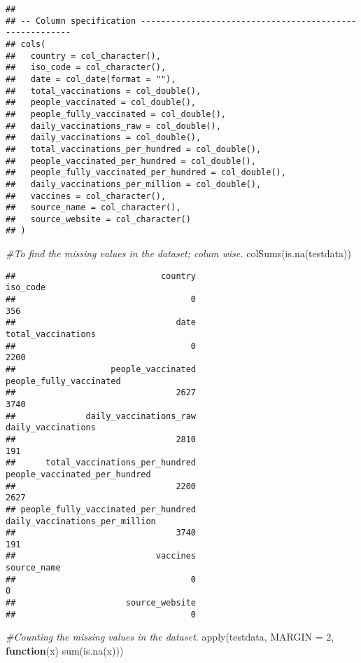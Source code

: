 \documentclass[
]{article}
\newenvironment{Shaded}{\begin{snugshade}}{\end{snugshade}}
\newcommand{\AttributeTok}[1]{\textcolor[rgb]{0.77,0.63,0.00}{#1}}
\newcommand{\CommentTok}[1]{\textcolor[rgb]{0.56,0.35,0.01}{\textit{#1}}}
\newcommand{\ControlFlowTok}[1]{\textcolor[rgb]{0.13,0.29,0.53}{\textbf{#1}}}
\newcommand{\DecValTok}[1]{\textcolor[rgb]{0.00,0.00,0.81}{#1}}
\newcommand{\FunctionTok}[1]{\textcolor[rgb]{0.00,0.00,0.00}{#1}}
\newcommand{\NormalTok}[1]{#1}
\begin{document}
\begin{verbatim}
## 
## -- Column specification --------------------------------------------------------
## cols(
##   country = col_character(),
##   iso_code = col_character(),
##   date = col_date(format = ""),
##   total_vaccinations = col_double(),
##   people_vaccinated = col_double(),
##   people_fully_vaccinated = col_double(),
##   daily_vaccinations_raw = col_double(),
##   daily_vaccinations = col_double(),
##   total_vaccinations_per_hundred = col_double(),
##   people_vaccinated_per_hundred = col_double(),
##   people_fully_vaccinated_per_hundred = col_double(),
##   daily_vaccinations_per_million = col_double(),
##   vaccines = col_character(),
##   source_name = col_character(),
##   source_website = col_character()
## )
\end{verbatim}

\begin{Shaded}
\begin{Highlighting}[]
\CommentTok{\#To find the missing values in the dataset; colum wise.}
\FunctionTok{colSums}\NormalTok{(}\FunctionTok{is.na}\NormalTok{(testdata))}
\end{Highlighting}
\end{Shaded}

\begin{verbatim}
##                             country                            iso_code 
##                                   0                                 356 
##                                date                  total_vaccinations 
##                                   0                                2200 
##                   people_vaccinated             people_fully_vaccinated 
##                                2627                                3740 
##              daily_vaccinations_raw                  daily_vaccinations 
##                                2810                                 191 
##      total_vaccinations_per_hundred       people_vaccinated_per_hundred 
##                                2200                                2627 
## people_fully_vaccinated_per_hundred      daily_vaccinations_per_million 
##                                3740                                 191 
##                            vaccines                         source_name 
##                                   0                                   0 
##                      source_website 
##                                   0
\end{verbatim}

\begin{Shaded}
\begin{Highlighting}[]
\CommentTok{\#Counting the missing values in the dataset.}
\FunctionTok{apply}\NormalTok{(testdata, }\AttributeTok{MARGIN =} \DecValTok{2}\NormalTok{, }\ControlFlowTok{function}\NormalTok{(x) }\FunctionTok{sum}\NormalTok{(}\FunctionTok{is.na}\NormalTok{(x)))}
\end{Highlighting}
\end{Shaded}
\end{document}
